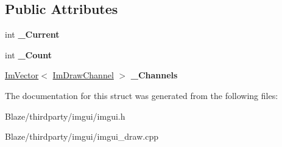 \subsection*{Public Attributes}
\begin{DoxyCompactItemize}
\item 
\mbox{\label{structImDrawListSplitter_a99a46d62e09810f31d0a6efd4a0d2b09}} 
int {\bfseries \+\_\+\+Current}
\item 
\mbox{\label{structImDrawListSplitter_ae3a1593ee05bc52e6284943eab3c97a2}} 
int {\bfseries \+\_\+\+Count}
\item 
\mbox{\label{structImDrawListSplitter_ab3b0bdddacaa7b347c41735c2d9952dc}} 
\hyperlink{structImVector}{Im\+Vector}$<$ \hyperlink{structImDrawChannel}{Im\+Draw\+Channel} $>$ {\bfseries \+\_\+\+Channels}
\end{DoxyCompactItemize}


The documentation for this struct was generated from the following files\+:\begin{DoxyCompactItemize}
\item 
Blaze/thirdparty/imgui/imgui.\+h\item 
Blaze/thirdparty/imgui/imgui\+\_\+draw.\+cpp\end{DoxyCompactItemize}
